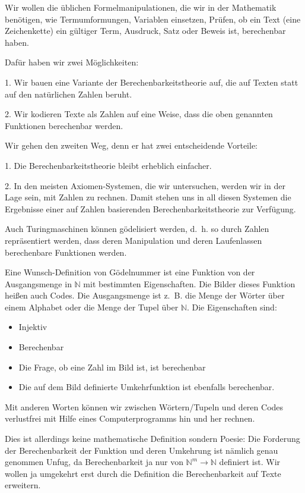\documentclass[a4paper]{amsart}
\theoremstyle{definition}
\newcommand{\N}{\ensuremath{\mathbb{ N }}}
\newcommand{\zb}{z.~B. }
\begin{document}
Wir wollen die üblichen Formelmanipulationen, die wir in der Mathematik benötigen, wie Termumformungen, Variablen einsetzen, Prüfen, ob ein Text (eine Zeichenkette) ein gültiger Term, Ausdruck, Satz oder Beweis ist, berechenbar haben.

Dafür haben wir zwei Möglichkeiten:

1. Wir bauen eine Variante der Berechenbarkeitstheorie auf, die auf Texten statt auf den natürlichen Zahlen beruht.

2. Wir kodieren Texte als Zahlen auf eine Weise, dass die oben genannten Funktionen berechenbar werden.

Wir gehen den zweiten Weg, denn er hat zwei entscheidende Vorteile:

1. Die Berechenbarkeitstheorie bleibt erheblich einfacher.

2. In den meisten Axiomen-Systemen, die wir untersuchen, werden wir in der Lage sein, mit Zahlen zu rechnen. Damit stehen uns in all diesen Systemen die Ergebnisse einer auf Zahlen basierenden Berechenbarkeitstheorie zur Verfügung.

Auch Turingmaschinen können gödelisiert werden, d.~h. so durch Zahlen repräsentiert werden, dass deren Manipulation und deren Laufenlassen berechenbare Funktionen werden.

Eine Wunsch-Definition von Gödelnummer ist eine Funktion von der Ausgangsmenge in $\N$ mit bestimmten Eigenschaften. Die Bilder dieses Funktion heißen auch Codes. Die Ausgangsmenge ist \zb die Menge der Wörter über einem Alphabet oder die Menge der Tupel über $\N$. Die Eigenschaften sind:
\begin{itemize}
   \item Injektiv
   \item Berechenbar
   \item Die Frage, ob eine Zahl im Bild ist, ist berechenbar
   \item Die auf dem Bild definierte Umkehrfunktion ist ebenfalls berechenbar.
\end{itemize}
Mit anderen Worten können wir zwischen Wörtern/Tupeln und deren Codes verlustfrei mit Hilfe eines Computerprogramms hin und her rechnen.

Dies ist allerdings keine mathematische Definition sondern Poesie:
Die Forderung der Berechenbarkeit der Funktion und deren Umkehrung ist nämlich genau genommen Unfug, da Berechenbarkeit ja nur von $\N^m \to \N$ definiert ist. Wir wollen ja umgekehrt erst durch die Definition die Berechenbarkeit auf Texte erweitern. 
\end{document}

